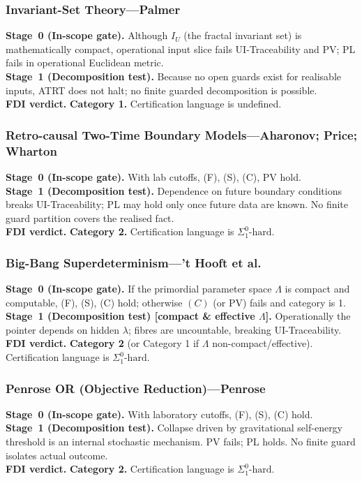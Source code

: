 \documentclass[12pt]{article}
\theoremstyle{definition}
\theoremstyle{plain}
\begin{document}
\subsubsection{Invariant-Set Theory––Palmer}
\textbf{Stage~0 (In-scope gate).} Although \(I_U\) (the fractal invariant set) is mathematically compact, operational input slice fails UI-Traceability and PV; PL fails in operational Euclidean metric.\\
\textbf{Stage~1 (Decomposition test).} Because no open guards exist for realisable inputs, ATRT does not halt; no finite guarded decomposition is possible.\\
\textbf{FDI verdict.} \textbf{Category 1.} Certification language is undefined.  



\subsubsection{Retro-causal Two-Time Boundary Models––Aharonov; Price; Wharton}
\textbf{Stage~0 (In-scope gate).} With lab cutoffs, (F), (S), (C), PV hold.\\
\textbf{Stage~1 (Decomposition test).} Dependence on future boundary conditions breaks UI-Traceability; PL may hold only once future data are known. No finite guard partition covers the realised fact.\\
\textbf{FDI verdict.} \textbf{Category 2.} Certification language is \(\Sigma^0_1\text{-hard}\).  

\subsubsection{Big-Bang Superdeterminism––’t Hooft et al.}
\textbf{Stage~0 (In-scope gate).} If the primordial parameter space \(\Lambda\) is compact and computable, (F), (S), (C) hold; otherwise \((C)\) (or PV) fails and category is 1.\\
\textbf{Stage~1 (Decomposition test) [compact \& effective \(\Lambda\)].} Operationally the pointer depends on hidden \(\lambda\); fibres are uncountable, breaking UI-Traceability.\\
\textbf{FDI verdict.} \textbf{Category 2} (or Category 1 if \(\Lambda\) non-compact/effective). Certification language is \(\Sigma^0_1\text{-hard}\).  

\subsubsection{Penrose OR (Objective Reduction)––Penrose}
\textbf{Stage~0 (In-scope gate).} With laboratory cutoffs, (F), (S), (C) hold.\\
\textbf{Stage~1 (Decomposition test).} Collapse driven by gravitational self-energy threshold is an internal stochastic mechanism. PV fails; PL holds. No finite guard isolates actual outcome.\\
\textbf{FDI verdict.} \textbf{Category 2.} Certification language is \(\Sigma^0_1\text{-hard}\).  
\end{document}
